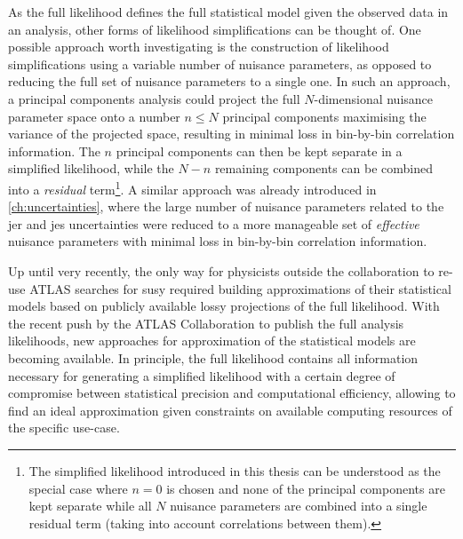 As the full likelihood defines the full statistical model given the observed data in an analysis, other forms of likelihood simplifications can be thought of.
One possible approach worth investigating is the construction of likelihood simplifications using a variable number of nuisance parameters, as opposed to reducing the full set of nuisance parameters to a single one.
In such an approach, a principal components analysis could project the full $N$-dimensional nuisance parameter space onto a number $n\leq N$ principal components maximising the variance of the projected space, \ie resulting in minimal loss in bin-by-bin correlation information.
The $n$ principal components can then be kept separate in a simplified likelihood, while the $N-n$ remaining components can be combined into a \textit{residual} term\footnote{The simplified likelihood introduced in this thesis can be understood as the special case where $n=0$ is chosen and none of the principal components are kept separate while all $N$ nuisance parameters are combined into a single residual term (taking into account correlations between them).}.
A similar approach was already introduced in \cref{ch:uncertainties}, where the large number of nuisance parameters related to the \gls{jer} and \gls{jes} uncertainties were reduced to a more manageable set of \textit{effective} nuisance parameters with minimal loss in bin-by-bin correlation information. 

Up until very recently, the only way for physicists outside the collaboration to re-use ATLAS searches for \gls{susy} required building approximations of their statistical models based on publicly available lossy projections of the full likelihood.
With the recent push by the ATLAS Collaboration to publish the full analysis likelihoods, new approaches for approximation of the statistical models are becoming available.
In principle, the full likelihood contains all information necessary for generating a simplified likelihood with a certain degree of compromise between statistical precision and computational efficiency, allowing to find an ideal approximation given constraints on available computing resources of the specific use-case.




